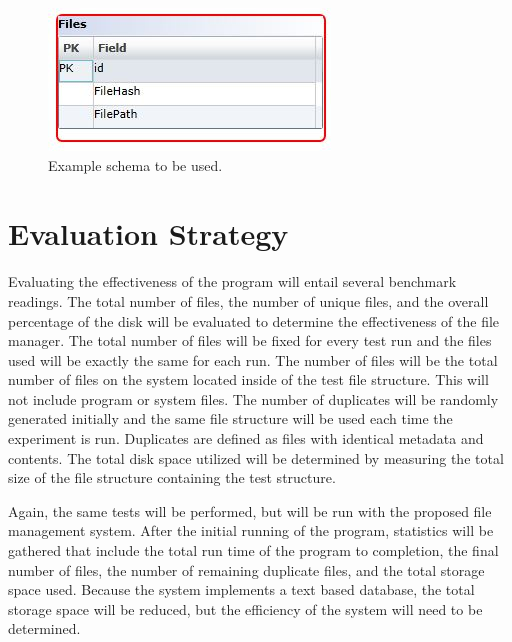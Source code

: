 \documentclass[11pt]{article}
\begin{document}
\begin{figure}
\begin{center}
\includegraphics[scale=.8]{schema}
\caption{\label{fig:schema} Example schema to be used.}
\end{center}
\end{figure}

\vspace*{-.2in}
\section{Evaluation Strategy}
\label{sec:evaluate}
\vspace*{-.1in}

Evaluating the effectiveness of the program will entail several benchmark readings. The total number of files, the number of unique files, and the overall percentage of the disk will be evaluated to determine the effectiveness of the file manager. The total number of files will be fixed for every test run and the files used will be exactly the same for each run. The number of files will be the total number of files on the system located inside of the test file structure. This will not include program or system files. The number of duplicates will be randomly generated initially and the same file structure will be used each time the experiment is run. Duplicates are defined as files with identical metadata and contents. The total disk space utilized will be determined by measuring the total size of the file structure containing the test structure.

Again, the same tests will be performed, but will be run with the proposed file management system. After the initial running of the program, statistics will be gathered that include the total run time of the program to completion, the final number of files, the number of remaining duplicate files, and the total storage space used. Because the system implements a text based database, the total storage space will be reduced, but the efficiency of the system will need to be determined.

\vspace*{-.1in}
\end{document}
